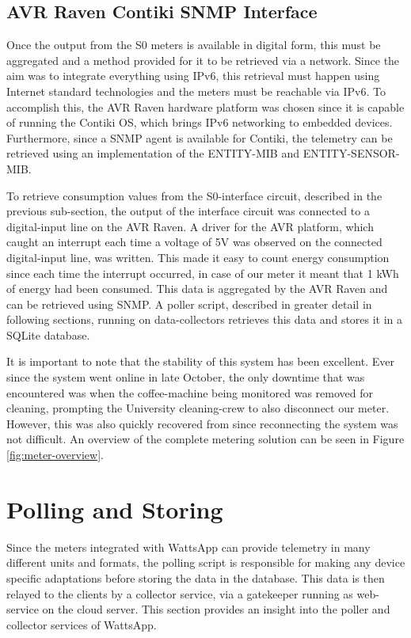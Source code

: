 \documentclass[10pt, conference, compsocconf]{IEEEtran}
\begin{document}
\subsection{AVR Raven Contiki SNMP Interface}

\label{subsec:avr-contiki-snmp}

Once the output from the S0 meters is available in digital form, this
must be aggregated and a method provided for it to be retrieved via
a network. Since the aim was to integrate everything using IPv6, this
retrieval must happen using Internet standard technologies and the
meters must be reachable via IPv6. To accomplish this, the AVR Raven
hardware platform was chosen since it is capable of running the Contiki
OS, which brings IPv6 networking to embedded devices. Furthermore,
since a SNMP agent is available for Contiki, the telemetry can be
retrieved using an implementation of the ENTITY-MIB and ENTITY-SENSOR-MIB.

To retrieve consumption values from the S0-interface circuit, described
in the previous sub-section, the output of the interface circuit was
connected to a digital-input line on the AVR Raven. A driver for the
AVR platform, which caught an interrupt each time a voltage of 5V
was observed on the connected digital-input line, was written. This
made it easy to count energy consumption since each time the interrupt
occurred, in case of our meter it meant that 1 kWh of energy had been
consumed. This data is aggregated by the AVR Raven and can be retrieved
using SNMP. A poller script, described in greater detail in following
sections, running on data-collectors retrieves this data and stores
it in a SQLite database.

It is important to note that the stability of this system has been
excellent. Ever since the system went online in late October, the
only downtime that was encountered was when the coffee-machine being
monitored was removed for cleaning, prompting the University cleaning-crew
to also disconnect our meter. However, this was also quickly recovered
from since reconnecting the system was not difficult. An overview
of the complete metering solution can be seen in Figure \ref{fig:meter-overview}.


\section{Polling and Storing}

Since the meters integrated with WattsApp can provide telemetry in
many different units and formats, the polling script is responsible
for making any device specific adaptations before storing the data
in the database. This data is then relayed to the clients by a collector
service, via a gatekeeper running as web-service on the cloud server.
This section provides an insight into the poller and collector services
of WattsApp.
\end{document}
